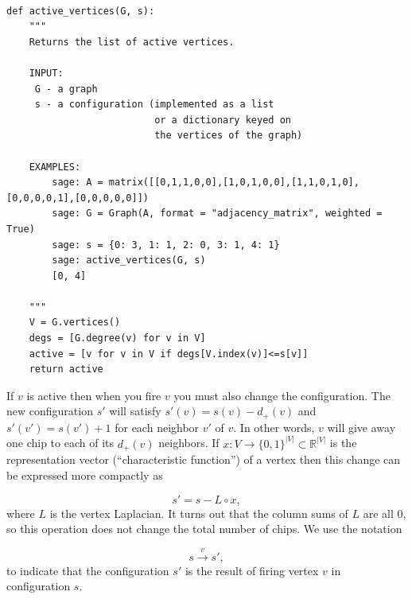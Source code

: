 \begin{Verbatim}[fontsize=\scriptsize,fontfamily=courier,fontshape=tt,frame=single,label=\sage]

def active_vertices(G, s):
    """
    Returns the list of active vertices.

    INPUT:
     G - a graph
     s - a configuration (implemented as a list
                          or a dictionary keyed on
                          the vertices of the graph)

    EXAMPLES:
        sage: A = matrix([[0,1,1,0,0],[1,0,1,0,0],[1,1,0,1,0],[0,0,0,0,1],[0,0,0,0,0]])
        sage: G = Graph(A, format = "adjacency_matrix", weighted = True)
        sage: s = {0: 3, 1: 1, 2: 0, 3: 1, 4: 1}
        sage: active_vertices(G, s)
        [0, 4]

    """
    V = G.vertices()
    degs = [G.degree(v) for v in V]
    active = [v for v in V if degs[V.index(v)]<=s[v]]
    return active

\end{Verbatim}
If $v$ is active then when you fire $v$ you must also change the
configuration. The new configuration $s'$ will satisfy
$s'(v) = s(v)-d_+(v)$ and $s'(v')=s(v')+1$ for each
neighbor $v'$ of $v$. In other words, $v$ will give away one chip to
each of its $d_+(v)$ neighbors. If $x:V\to \{0,1\}^{|V|}\subset {\mathbb{R}}^{|V|}$ is
the representation vector (``characteristic function'') of a vertex
then this change can be expressed more compactly as

\begin{equation}
\label{eqn:fire}
s'= s-L\circ x,
\end{equation}
where $L$ is the vertex Laplacian. It turns out that the column sums
of $L$ are all $0$, so this operation does not change the total
number of chips. We use the notation

\[
s\overset{v}{\to} s',
\]
to indicate that the configuration $s'$ is the
result of firing vertex $v$ in configuration $s$.

